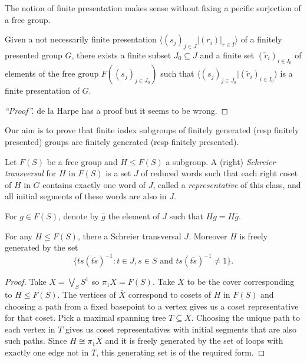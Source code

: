 \documentclass[a4paper]{article}
\begin{document}
The notion of finite presentation makes sense without fixing a pecific surjection of a free group.

\begin{theorem}
  Given a not necessarily finite presentation \(\langle (s_j)_{j \in J} | (r_i)|_{r \in I} \rangle\) of a finitely presented group \(G\), there exists a finite subset \(J_0 \subseteq J\) and a finite set \((\tilde r_i)_{i \in I_0}\) of elements of the free group \(F((s_j)_{j \in J_0})\) such that \(\langle (s_j)_{j \in J_0} | (\tilde r_i)_{i \in I_0} \rangle\) is a finite presentation of \(G\).
\end{theorem}

\begin{proof}[``Proof'']
  de la Harpe has a proof but it seems to be wrong.
\end{proof}

Our aim is to prove that finite index subgroups of finitely generated (resp finitely presented) groups are finitely generated (resp finitely presented).

\begin{definition}
  Let \(F(S)\) be a free group and \(H \leq F(S)\) a subgroup. A (right) \emph{Schreier transversal} for \(H\) in \(F(S)\) is a set \(J\) of reduced words such that each right coset of \(H\) in \(G\) contains exactly one word of \(J\), called a \emph{representative} of this class, and all initial segments of these words are also in \(J\).

  For \(g \in F(S)\), denote by \(\overline g\) the element of \(J\) such that \(Hg = H \overline g\).
\end{definition}

\begin{theorem}
  For any \(H \leq F(S)\), there a Schreier transversal \(J\). Moreover \(H\) is freely generated by the set
  \[
    \{ts(\overline{ts})^{-1}: t \in J, s \in S \text{ and } ts(\overline{ts})^{-1} \ne 1\}.
  \]
\end{theorem}

\begin{proof}
  Take \(X = \bigvee_S S^1\) so \(\pi_1X = F(S)\). Take \(\overline X\) to be the cover corresponding to \(H \leq F(S)\). The vertices of \(\overline X\) correspond to cosets of \(H\) in \(F(S)\) and choosing a path from a fixed basepoint to a vertex gives us a coset representative for that coset. Pick a maximal spanning tree \(T \subseteq \overline X\). Choosing the unique path to each vertex in \(T\) gives us coset representatives with initial segments that are also such paths. Since \(H \cong \pi_1\overline X\) and it is freely generated by the set of loops with exactly one edge not in \(T\), this generating set is of the required form.
\end{proof}
\end{document}
